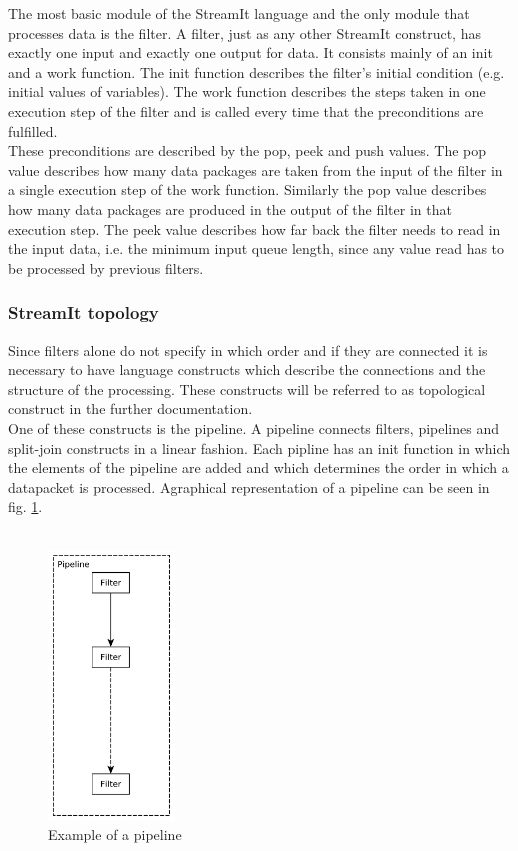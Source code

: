 \documentclass[journal]{IEEEtran}
\begin{document}
The most basic module of the StreamIt language and the only module that
processes data is the filter. A filter, just as any other StreamIt construct,
has exactly one input and exactly one output for data. It consists mainly of 
an init and a work function. The init function describes the filter's initial
condition (e.g. initial values of variables). The work function describes the
steps taken in one execution step of the filter and is called every time that
the preconditions are fulfilled.\\

These preconditions are described by the pop, peek and push values. The pop
value describes how many data packages are taken from the input of the filter in
a single execution step of the work function. Similarly the pop value describes
how many data packages are produced in the output of the filter in that
execution step. The peek value describes how far back the filter needs to read
in the input data, i.e. the minimum input queue length, since any value read has
to be processed by previous filters.


\subsubsection{StreamIt topology}
\label{StreamItTopology}
\noindent Since filters alone do not specify in which order and if they are
connected it is necessary to have language constructs which describe the
connections and the structure of the processing. These constructs will be
referred to as topological construct in the further documentation.\\

One of these constructs is the pipeline. A pipeline connects filters, pipelines
and split-join constructs in a linear fashion. Each pipline has an init function
in which the elements of the pipeline are added and which determines the order
in which a datapacket is processed. Agraphical representation of a pipeline can 
be seen in fig. \ref{fig_Pipeline}.\\
\\

\begin{figure}[h]
	\centering
	\includegraphics[width=0.3\textwidth]{PipelineGraphic}
	\caption{Example of a pipeline}
	\label{fig_Pipeline}
\end{figure}
\end{document}
